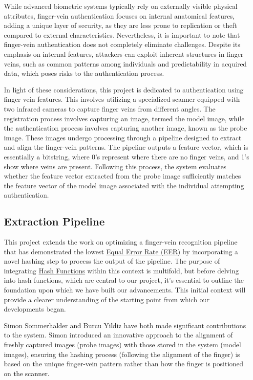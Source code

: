 While advanced biometric systems typically rely on externally visible physical attributes, finger-vein authentication focuses on internal anatomical features, adding a unique layer of security, as they are less prone to replication or theft compared to external characteristics. Nevertheless, it is important to note that finger-vein authentication does not completely eliminate challenges. Despite its emphasis on internal features, attackers can exploit inherent structures in finger veins, such as common patterns among individuals and predictability in acquired data, which poses risks to the authentication process.

In light of these considerations, this project is dedicated to authentication using finger-vein features.
This involves utilizing a specialized scanner equipped with two infrared cameras to capture finger veins from different angles.
The registration process involves capturing an image, termed the model image, while the authentication process involves capturing another image, known as the probe image. These images undergo processing through a pipeline designed to extract and align the finger-vein patterns.
The pipeline outputs a feature vector, which is essentially a bitstring, where 0's represent where there are no finger veins, and 1's show where veins are present.
Following this process, the system evaluates whether the feature vector extracted from the probe image sufficiently matches the feature vector of the model image associated with the individual attempting authentication.

\subsection{Extraction Pipeline}\label{sec:extraction-pipeline}

This project extends the work on optimizing a finger-vein recognition pipeline that has demonstrated the lowest \hyperref[def:EER]{Equal Error Rate (EER)} by incorporating a novel hashing step to process the output of the pipeline. The purpose of integrating \hyperref[def:Hash_Function]{Hash Functions} within this context is multifold, but before delving into hash functions, which are central to our project, it's essential to outline the foundation upon which we have built our advancements. This initial context will provide a clearer understanding of the starting point from which our developments began.

Simon Sommerhalder and Burcu Yildiz have both made significant contributions to the system. Simon introduced an innovative approach to the alignment of freshly captured images (probe images) with those stored in the system (model images), ensuring the hashing process (following the alignment of the finger) is based on the unique finger-vein pattern rather than how the finger is positioned on the scanner.

